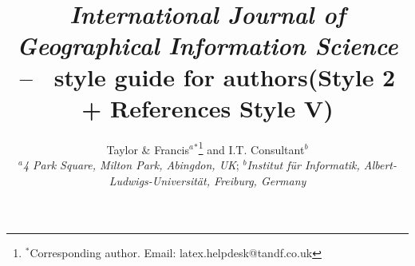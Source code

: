\documentclass[]{tGIS2e}
\begin{document}



\title{{\itshape International Journal of Geographical Information Science} -- \LaTeXe\ style guide
for authors\newline (Style 2 + References Style V)}

\author{Taylor \& Francis$^{a}$$^{\ast}$\thanks{$^\ast$Corresponding author. Email: latex.helpdesk@tandf.co.uk
\vspace{6pt}} and I.T. Consultant$^{b}$\\\vspace{6pt}  $^{a}${\em{4 Park Square, Milton Park, Abingdon, UK}};
$^{b}${\em{Institut f\"{u}r Informatik, Albert-Ludwigs-Universit\"{a}t, Freiburg,
Germany}}\\\vspace{6pt} }

\maketitle
\end{document}
